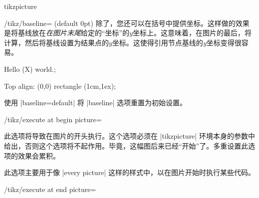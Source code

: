 \begin{environment}{{tikzpicture}}
\begin{key}{/tikz/baseline= (default 0pt)}
        除了，您还可以在括号中提供坐标。这样做的效果是将基线放在\emph{在图片末尾}给定的``坐标''的$y$坐标上。这意味着，在图片的最后，将计算，然后将基线设置为结果点的$y$坐标。这使得引用节点基线的$y$坐标变得很容易。
\begin{codeexample}[preamble={\usetikzlibrary{shapes.misc}}]
Hello
\tikz[baseline=(X.base)]
   (X) {world.};
\end{codeexample}

\begin{codeexample}[]
Top align:
\tikz[baseline=(current bounding box.north)]
  \draw (0,0) rectangle (1cm,1ex);
\end{codeexample}


        使用 |baseline=default| 将 |baseline| 选项重置为初始设置。
    \end{key}

    \begin{key}{/tikz/execute at begin picture=}

        此选项将导致在图片的开头执行。这个选项必须在 |{tikzpicture}| 环境本身的参数中给出，否则这个选项将不起作用。毕竟，这幅图后来已经``开始''了。多重设置此选项的效果会累积。


        此选项主要用于像 |every picture| 这样的样式中，以在图片开始时执行某些代码。
    \end{key}

    \begin{key}{/tikz/execute at end picture=}


\end{key}
\end{environment}
